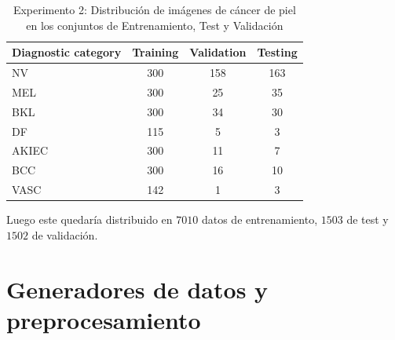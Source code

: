 \begin{table}[ht]
   \centering
   \begin{tabular}{lccc}
   \hline
   \textbf{Diagnostic category} & \textbf{Training} & \textbf{Validation} & \textbf{Testing} \\
   \hline
   NV       & 300 & 158 & 163 \\
   MEL      & 300 & 25  & 35  \\
   BKL      & 300 & 34  & 30  \\
   DF       & 115 & 5   & 3   \\
   AKIEC    & 300 & 11  & 7   \\
   BCC      & 300 & 16  & 10  \\
   VASC     & 142 & 1   & 3   \\ \hline
   \end{tabular}
   \caption{Experimento 2: Distribución de imágenes de cáncer de piel en los conjuntos de Entrenamiento, Test y Validación}
   \label{table:train_test_validate_e2}
   \end{table}
   


Luego este quedaría distribuido en $7010$ datos de entrenamiento, $1503$ de test y $1502$ de validación.

\section{Generadores de datos y preprocesamiento}

